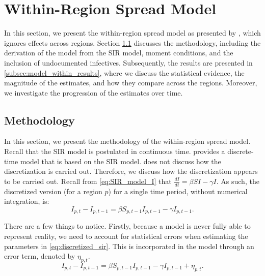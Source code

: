 \documentclass[12pt]{article}
\begin{document}
	\section{Within-Region Spread Model} \label{sec:model_within}
	In this section, we present the within-region spread model as presented by \textcite{adda2016economic}, which ignores effects across regions. Section \ref{subsec:model_within_methodology} discusses the methodology, including the derivation of the model from the SIR model, moment conditions, and the inclusion of undocumented infectives. Subsequently, the results are presented in \ref{subsec:model_within_results}, where we discuss the statistical evidence, the magnitude of the estimates, and how they compare across the regions. Moreover, we investigate the progression of the estimates over time.
	
	\subsection{Methodology} \label{subsec:model_within_methodology}
	In this section, we present the methodology of the within-region spread model. Recall that the SIR model is postulated in continuous time. \textcite{adda2016economic} provides a discrete-time model that is based on the SIR model. \textcite{adda2016economic} does not discuss how the discretization is carried out. Therefore, we discuss how the discretization appears to be carried out. Recall from \eqref{eq:SIR_model_I} that $\frac{dI}{dt} = \beta SI - \gamma I$. As such, the discretized version (for a region $p$) for a single time period, without numerical integration, is:
	    \begin{equation}\label{eq:discretized_sir}
	        I_{p,t} - I_{p,t-1} = \beta S_{p,t-1}I_{p,t-1} - \gamma I_{p,t-1}.
	    \end{equation}
	   
	There are a few things to notice. Firstly, because a model is never fully able to represent reality, we need to account for statistical errors when estimating the parameters in \eqref{eq:discretized_sir}. This is incorporated in the model through an error term, denoted by $\eta_{p,t}$.
	    \begin{equation}\label{eq:discretized_sir_error}
	        I_{p,t} - I_{p,t-1} = \beta S_{p,t-1}I_{p,t-1} - \gamma I_{p,t-1} + \eta_{p,t}.
	    \end{equation}
	
\end{document}
